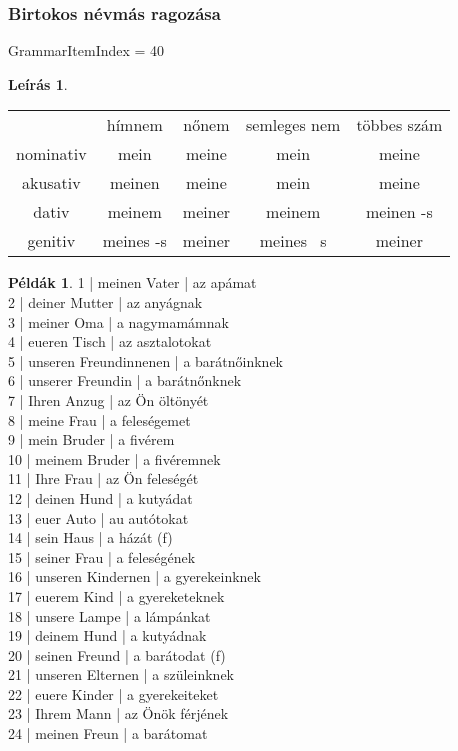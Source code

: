 \documentclass{article}
\theoremstyle{definition}
\newtheorem*{exmp}{Példák}
\newtheorem*{desc}{Leírás}
\begin{document}
\subsubsection{Birtokos névmás ragozása}

GrammarItemIndex = 40

\begin{desc}
\begin{tabular}{ccccc}
 & hímnem & nőnem & semleges nem & többes szám \\
nominativ & mein & meine & mein & meine \\
akusativ & meinen & meine & mein & meine \\
dativ & meinem & meiner & meinem & meinen -s \\
genitiv & meines -s & meiner & meines ~s & meiner \\
\end{tabular}
\end{desc}

\begin{exmp}
1 | meinen Vater | az apámat\\
2 | deiner Mutter | az anyágnak\\
3 | meiner Oma | a nagymamámnak\\
4 | eueren Tisch | az asztalotokat\\
5 | unseren Freundinnenen | a barátnőinknek\\
6 | unserer Freundin | a barátnőnknek\\
7 | Ihren Anzug | az Ön öltönyét\\
8 | meine Frau | a feleségemet\\
9 | mein Bruder | a fivérem\\
10 | meinem Bruder | a fivéremnek\\
11 | Ihre Frau | az Ön feleségét\\
12 | deinen Hund | a kutyádat\\
13 | euer Auto | au autótokat\\
14 | sein Haus | a házát (f)\\
15 | seiner Frau | a feleségének\\
16 | unseren Kindernen | a gyerekeinknek\\
17 | euerem Kind | a gyereketeknek\\
18 | unsere Lampe | a lámpánkat\\
19 | deinem Hund | a kutyádnak\\
20 | seinen Freund | a barátodat (f)\\
21 | unseren Elternen | a szüleinknek\\
22 | euere Kinder | a gyerekeiteket\\
23 | Ihrem Mann | az Önök férjének\\
24 | meinen Freun | a barátomat\\
\end{exmp}
\end{document}
